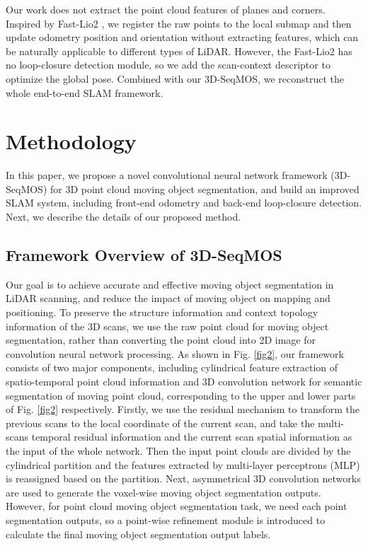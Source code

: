 \documentclass[lettersize,journal]{IEEEtran}
\begin{document}
Our work does not extract the point cloud features of planes and corners. Inspired by Fast-Lio2 \cite{xu2022fast}, we register the raw points to the local submap and then update odometry position and orientation without extracting features, which can be naturally applicable to different types of LiDAR. However, the Fast-Lio2 has no loop-closure detection module, so we add the scan-context descriptor to optimize the global pose. Combined with our 3D-SeqMOS, we reconstruct the whole end-to-end SLAM framework. 




\section{Methodology}
In this paper, we propose a novel convolutional neural network framework (3D-SeqMOS) for 3D point cloud moving object segmentation, and build an improved SLAM system, including front-end odometry and back-end loop-closure detection. Next, we describe the details of our proposed method.






\subsection{Framework Overview of 3D-SeqMOS}
Our goal is to achieve accurate and effective moving object segmentation in LiDAR scanning, and reduce the impact of moving object on mapping and positioning. To preserve the structure information and context topology information of the 3D scans, we use the raw point cloud for moving object segmentation, rather than converting the point cloud into 2D image for convolution neural network processing. As shown in Fig. \ref{fig2}, our framework consists of two major components, including cylindrical feature extraction of spatio-temporal point cloud information and 3D convolution network for semantic segmentation of moving point cloud, corresponding to the upper and lower parts of Fig. \ref{fig2} respectively. Firstly, we use the residual mechanism to transform the previous scans to the local coordinate of the current scan, and take the multi-scans temporal residual information and the current scan spatial information as the input of the whole network. Then the input point clouds are divided by the cylindrical partition and the features extracted by multi-layer perceptrons (MLP) is reassigned based on the partition. Next, asymmetrical 3D convolution networks are used to generate the voxel-wise moving object segmentation outputs. However, for point cloud moving object segmentation task, we need each point segmentation outputs, so a point-wise refinement module is introduced to calculate the final moving object segmentation output labels.
\end{document}
